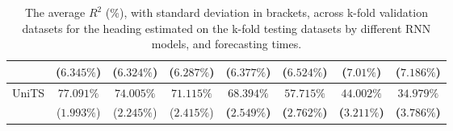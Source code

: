 \begin{table}[!ht]
{\begin{tabular}{|c|c|c|c|c|c|c|c|}
			 & ($6.345\%$) & ($6.324\%$) & ($6.287\%$) & ($6.377\%$) & ($6.524\%$) & ($7.01\%$) & ($7.186\%$) \\ \hline
			\multirow{2}{*}{UniTS} & $77.091\%$ & $74.005\%$ & $71.115\%$ & $\mathbf{68.394\%}$ & $\mathbf{57.715\%}$ & $\mathbf{44.002\%}$ & $\mathbf{34.979\%}$ \\
			 & ($1.993\%$) & ($2.245\%$) & ($2.415\%$) & \textbf{(}$\mathbf{2.549\%}$\textbf{)} & \textbf{(}$\mathbf{2.762\%}$\textbf{)} & \textbf{(}$\mathbf{3.211\%}$\textbf{)} & \textbf{(}$\mathbf{3.786\%}$\textbf{)} \\ \hline
		\end{tabular}
	}
	\caption{The average $R^{2}$ (\%), with standard deviation in brackets, across k-fold validation datasets for the heading estimated on the k-fold testing datasets by different RNN models, and forecasting times.}
	\label{tab:all_direction_R2}
\end{table}